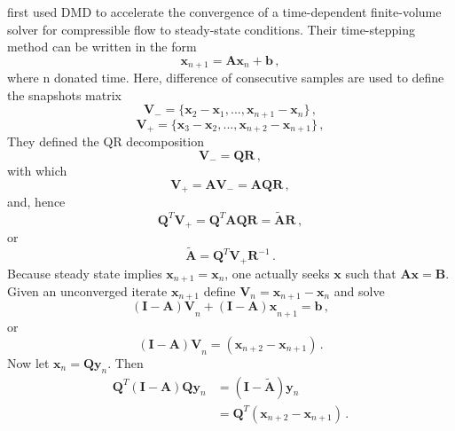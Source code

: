 \citet{andersson_novel} first used DMD to accelerate the convergence of a time-dependent finite-volume solver for compressible flow to steady-state conditions.
Their time-stepping method can be written in the form 
\begin{equation}
 \mathbf{x}_{n+1} = \mathbf{Ax}_n + \mathbf{b} \, ,
 \label{eq:andersson_1}
\end{equation}
where n donated time. Here, difference of consecutive samples are used to define the snapshots matrix 
\begin{equation}
 \mathbf{V}_- = \{\mathbf{x}_2-\mathbf{x}_1,..., \mathbf{x}_{n+1}-\mathbf{x}_{n} \} \, ,
 \label{eq:andersson_snapshot-}
\end{equation}
\begin{equation}
 \mathbf{V}_+ = \{\mathbf{x}_3-\mathbf{x}_2,..., \mathbf{x}_{n+2}-\mathbf{x}_{n+1} \} \, ,
 \label{eq:andersson_snapshot+}
\end{equation}
They defined the QR decomposition 
\begin{equation}
 \mathbf{V}_- = \mathbf{QR} \, ,
 \label{eq:andersson_qr}
\end{equation}
with which
\begin{equation}
 \mathbf{V}_+ = \mathbf{AV}_{-} = \mathbf{AQR} \, ,
 \label{eq:andersson_av}
\end{equation}
and, hence
\begin{equation}
 \mathbf{Q}^{T} \mathbf{V}_{+} = \mathbf{Q}^{T} \mathbf{AQR} = \mathbf{\tilde{A}R} \, ,
 \label{eq:andersson_qv1}
\end{equation}
or
\begin{equation}
 \mathbf{\tilde{A}} = \mathbf{Q}^{T}  \mathbf{V}_+ \mathbf{R}^{-1} \, .
 \label{eq:andersson_qv2}
\end{equation}
Because steady state implies $\mathbf{x}_{n+1} = \mathbf{x}_{n}$, one actually seeks $\mathbf{x}$ such that $\mathbf{Ax=B}$.
Given an unconverged iterate $\mathbf{x}_{n+1}$ define $\mathbf{V}_n = \mathbf{x}_{n+1} - \mathbf{x}_{n}$ and solve 
\begin{equation}
 \mathbf{(I-A)V}_n + \mathbf{(I-A)x}_{n+1} = \mathbf{b} \, ,
 \label{eq:andersson_ia1}
\end{equation}
or
\begin{equation}
 \mathbf{(I-A)V}_n = (\mathbf{x}_{n+2} - \mathbf{x}_{n+1}) \, .
 \label{eq:andersson_ia2}
\end{equation}
Now let $\mathbf{x}_n = \mathbf{Q} \mathbf{y}_n$. Then 
\begin{equation}
\begin{split}
   \mathbf{Q}^T \mathbf{(I - A)} \mathbf{Q} \mathbf{y}_n & = \mathbf{(I - \tilde{A})} \mathbf{y}_n\\
   & = \mathbf{Q}^T (\mathbf{x}_{n+2} - \mathbf{x}_{n+1}) \, .
\end{split}
\label{eq:andersson_xy}
\end{equation}
